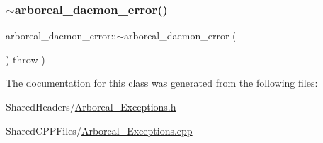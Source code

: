 \subsubsection{\texorpdfstring{$\sim$arboreal\+\_\+daemon\+\_\+error()}{~arboreal\_daemon\_error()}}
{\footnotesize\ttfamily arboreal\+\_\+daemon\+\_\+error\+::$\sim$arboreal\+\_\+daemon\+\_\+error (\begin{DoxyParamCaption}{ }\end{DoxyParamCaption}) throw  ) }



The documentation for this class was generated from the following files\+:\begin{DoxyCompactItemize}
\item 
Shared\+Headers/\mbox{\hyperlink{_arboreal___exceptions_8h}{Arboreal\+\_\+\+Exceptions.\+h}}\item 
Shared\+C\+P\+P\+Files/\mbox{\hyperlink{_arboreal___exceptions_8cpp}{Arboreal\+\_\+\+Exceptions.\+cpp}}\end{DoxyCompactItemize}
